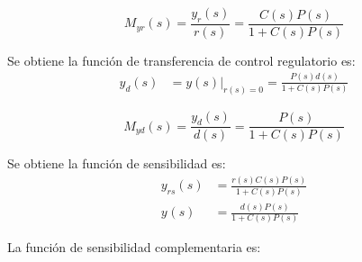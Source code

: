 \begin{enumerate}
    \begin{equation*}
      \tag{Función de Transferencia del servo control}
      M_{yr}(s) = \frac{y_r(s)}{r(s)} = \frac{C(s) P(s)}{1 + C(s) P(s)}
    \end{equation*}

    Se obtiene la función de transferencia de control regulatorio es:
    \begin{align*}
      y_{d}(s) &= y(s)|_{r(s)=0} = \frac{P(s) d(s) }{1 + C(s) P(s)}
    \end{align*}

    \begin{equation*}
      \tag{Función de Transferencia del control regulatorio}
      M_{yd}(s) = \frac{y_d(s)}{d(s)} = \frac{P(s)}{1 + C(s) P(s)}
    \end{equation*}

    Se obtiene la función de sensibilidad es:
    \begin{align*}
      y_{rs}(s) &= \frac{r(s) C(s) P(s)}{1 + C(s) P(s)}  
      \\
      y_{}(s) &= \frac{d(s) P(s)}{1 + C(s) P(s)}
    \end{align*}

    La función de sensibilidad complementaria es:


  \end{enumerate}



